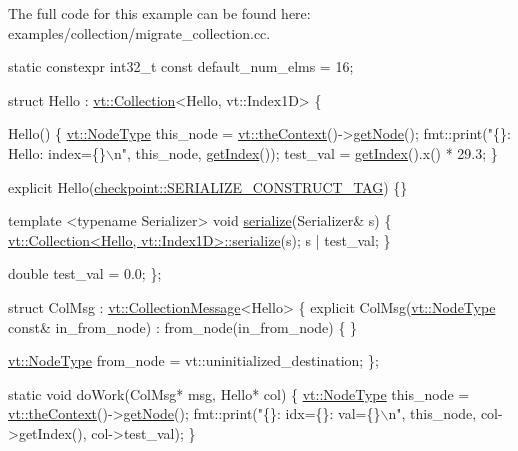 The full code for this example can be found here\+: {\ttfamily examples/collection/migrate\+\_\+collection.\+cc}.


\begin{DoxyCodeInclude}
\textcolor{keyword}{static} constexpr int32\_t \textcolor{keyword}{const} default\_num\_elms = 16;

\textcolor{keyword}{struct }Hello : \hyperlink{structvt_1_1vrt_1_1collection_1_1_collection}{vt::Collection}<Hello, vt::Index1D> \{

  Hello() \{
    \hyperlink{namespacevt_a866da9d0efc19c0a1ce79e9e492f47e2}{vt::NodeType} this\_node = \hyperlink{namespacevt_a26551fe0e6e6a1371111df5b12c7e92c}{vt::theContext}()->\hyperlink{structvt_1_1ctx_1_1_context_a0d52c263ce8516546a67443d9a86fa5f}{getNode}();
    fmt::print(\textcolor{stringliteral}{"\{\}: Hello: index=\{\}\(\backslash\)n"}, this\_node, \hyperlink{structvt_1_1vrt_1_1collection_1_1_indexable_a28d05f23e7a20e12e94b8235305c1e82}{getIndex}());
    test\_val = \hyperlink{structvt_1_1vrt_1_1collection_1_1_indexable_a28d05f23e7a20e12e94b8235305c1e82}{getIndex}().x() * 29.3;
  \}

  \textcolor{keyword}{explicit} Hello(\hyperlink{structcheckpoint_1_1dispatch_1_1_s_e_r_i_a_l_i_z_e___c_o_n_s_t_r_u_c_t___t_a_g}{checkpoint::SERIALIZE\_CONSTRUCT\_TAG}) \{\}

  \textcolor{keyword}{template} <\textcolor{keyword}{typename} Serializer>
  \textcolor{keywordtype}{void} \hyperlink{structvt_1_1vrt_1_1collection_1_1_collection_base_a8f5dc077e523958ea8b7290b8a10846f}{serialize}(Serializer& s) \{
    \hyperlink{structvt_1_1vrt_1_1collection_1_1_collection_base_a8f5dc077e523958ea8b7290b8a10846f}{vt::Collection<Hello, vt::Index1D>::serialize}(s);
    s | test\_val;
  \}

  \textcolor{keywordtype}{double} test\_val = 0.0;
\};

\textcolor{keyword}{struct }ColMsg : \hyperlink{structvt_1_1vrt_1_1collection_1_1_collection_message}{vt::CollectionMessage}<Hello> \{
  \textcolor{keyword}{explicit} ColMsg(\hyperlink{namespacevt_a866da9d0efc19c0a1ce79e9e492f47e2}{vt::NodeType} \textcolor{keyword}{const}& in\_from\_node)
    : from\_node(in\_from\_node)
  \{ \}

  \hyperlink{namespacevt_a866da9d0efc19c0a1ce79e9e492f47e2}{vt::NodeType} from\_node = vt::uninitialized\_destination;
\};

\textcolor{keyword}{static} \textcolor{keywordtype}{void} doWork(ColMsg* msg, Hello* col) \{
  \hyperlink{namespacevt_a866da9d0efc19c0a1ce79e9e492f47e2}{vt::NodeType} this\_node = \hyperlink{namespacevt_a26551fe0e6e6a1371111df5b12c7e92c}{vt::theContext}()->\hyperlink{structvt_1_1ctx_1_1_context_a0d52c263ce8516546a67443d9a86fa5f}{getNode}();
  fmt::print(\textcolor{stringliteral}{"\{\}: idx=\{\}: val=\{\}\(\backslash\)n"}, this\_node, col->getIndex(), col->test\_val);
\}


\end{DoxyCodeInclude}
